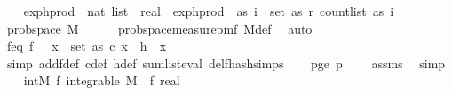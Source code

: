 \begin{isabellebody}
\isanewline
\ \ \isamarkupfalse%
\ exp{\isacharunderscore}{\kern0pt}h{\isacharunderscore}{\kern0pt}prod\ {\isacharcolon}{\kern0pt}{\isacharcolon}{\kern0pt}\ {\isachardoublequoteopen}nat\ list\ {\isasymRightarrow}\ real{\isachardoublequoteclose}\ \ {\isachardoublequoteopen}exp{\isacharunderscore}{\kern0pt}h{\isacharunderscore}{\kern0pt}prod\ {\isacharequal}{\kern0pt}\ {\isacharparenleft}{\kern0pt}{\isasymlambda}as{\isachardot}{\kern0pt}\ {\isacharparenleft}{\kern0pt}{\isasymProd}i\ {\isasymin}\ set\ as{\isachardot}{\kern0pt}\ r\ {\isacharparenleft}{\kern0pt}count{\isacharunderscore}{\kern0pt}list\ as\ i{\isacharparenright}{\kern0pt}{\isacharparenright}{\kern0pt}{\isacharparenright}{\kern0pt}{\isachardoublequoteclose}\isanewline
\isanewline
\ \ \isamarkupfalse%
\ prob{\isacharunderscore}{\kern0pt}space\ M\isanewline
\ \ \ \ \isamarkupfalse%
\ prob{\isacharunderscore}{\kern0pt}space{\isacharunderscore}{\kern0pt}measure{\isacharunderscore}{\kern0pt}pmf\ M{\isacharunderscore}{\kern0pt}def\ \isamarkupfalse%
\ auto\isanewline
\isanewline
\ \ \isamarkupfalse%
\ f{\isacharunderscore}{\kern0pt}eq{\isacharcolon}{\kern0pt}\ {\isachardoublequoteopen}f\ {\isacharequal}{\kern0pt}\ {\isacharparenleft}{\kern0pt}{\isasymlambda}{\isasymomega}{\isachardot}{\kern0pt}\ {\isacharparenleft}{\kern0pt}{\isasymSum}x\ {\isasymin}\ set\ as{\isachardot}{\kern0pt}\ c\ x\ {\isacharasterisk}{\kern0pt}\ h\ {\isasymomega}\ x{\isacharparenright}{\kern0pt}{\isacharcircum}{\kern0pt}{}{\isacharparenright}{\kern0pt}{\isachardoublequoteclose}\isanewline
\ \ \ \ \isamarkupfalse%
\ {\isacharparenleft}{\kern0pt}simp\ add{\isacharcolon}{\kern0pt}f{\isacharunderscore}{\kern0pt}def\ c{\isacharunderscore}{\kern0pt}def\ h{\isacharunderscore}{\kern0pt}def\ sum{\isacharunderscore}{\kern0pt}list{\isacharunderscore}{\kern0pt}eval\ del{\isacharcolon}{\kern0pt}f{}{\isacharunderscore}{\kern0pt}hash{\isachardot}{\kern0pt}simps{\isacharparenright}{\kern0pt}\isanewline
\isanewline
\ \ \isamarkupfalse%
\ p{\isacharunderscore}{\kern0pt}ge{\isacharunderscore}{\kern0pt}{}{\isacharcolon}{\kern0pt}\ {\isachardoublequoteopen}p\ {\isachargreater}{\kern0pt}\ {}{\isachardoublequoteclose}\ \isamarkupfalse%
\ assms{\isacharparenleft}{\kern0pt}{}{\isacharparenright}{\kern0pt}\ \isamarkupfalse%
\ simp\isanewline
\isanewline
\ \ \isamarkupfalse%
\ int{\isacharunderscore}{\kern0pt}M{\isacharcolon}{\kern0pt}\ {\isachardoublequoteopen}{\isasymAnd}f{\isachardot}{\kern0pt}\ integrable\ M\ {\isacharparenleft}{\kern0pt}{\isasymlambda}{\isasymomega}{\isachardot}{\kern0pt}\ {\isacharparenleft}{\kern0pt}{\isacharparenleft}{\kern0pt}f\ {\isasymomega}{\isacharparenright}{\kern0pt}{\isacharcolon}{\kern0pt}{\isacharcolon}{\kern0pt}real{\isacharparenright}{\kern0pt}{\isacharparenright}{\kern0pt}{\isachardoublequoteclose}\isanewline

\end{isabellebody}
